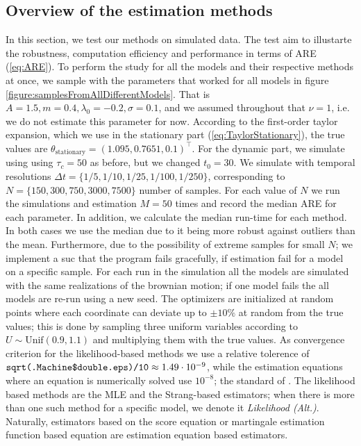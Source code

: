 \subsection{Overview of the estimation methods}
In this section, we test our methods on simulated data. The test aim to illustarte the robustness, computation efficiency and performance in terms of ARE (\ref{eq:ARE}). To perform the study for all the models and their respective methods at once, we sample with the parameters that worked for all models in figure \ref{figure:samplesFromAllDifferentModels}. That is $A = 1.5, m = 0.4, \lambda_0 = -0.2, \sigma = 0.1$, and we assumed throughout that $\nu = 1$, i.e. we do not estimate this parameter for now. According to the first-order taylor expansion, which we use in the stationary part (\ref{eq:TaylorStationary}), the true values are $\theta_{\mathrm{stationary}} = (1.095, 0.7651, 0.1)^\top$.  For the dynamic part, we simulate using using $\tau_c = 50$ as before, but we changed $t_0 = 30$. We simulate with temporal resolutions $\Delta t = \{1/5, 1/10, 1/25, 1/100, 1/250\}$, corresponding to $N = \{150, 300, 750, 3000, 7500\}$ number of samples. For each value of $N$ we run the simulations and estimation $M = 50$ times and record the median ARE for each parameter. In addition, we calculate the median run-time for each method. In both cases we use the median due to it being more robust against outliers than the mean. Furthermore, due to the possibility of extreme samples for small $N$; we implement a  suc that the program fails gracefully, if estimation fail for a model on a specific sample. For each run in the simulation all the models are simulated with the same realizations of the brownian motion; if one model fails the all models are re-run using a new seed. The optimizers are initialized at random points where each coordinate can deviate up to $\pm 10\%$ at random from the true values; this is done by sampling three uniform variables according to $U\sim\mathrm{Unif}(0.9, 1.1)$ and multiplying them with the true values.
As convergence criterion for the likelihood-based methods we use a relative tolerence of $\texttt{sqrt(.Machine\$double.eps)/10}\approx 1.49\cdot 10^{-9}$, while the estimation equations where an equation is numerically solved use $10^{-8}$; the standard of . The likelihood based methods are the MLE and the Strang-based estimators; when there is more than one such method for a specific model, we denote it \textit{Likelihood (Alt.)}. Naturally, estimators based on the score equation or martingale estimation function based equation are estimation equation based estimators.
